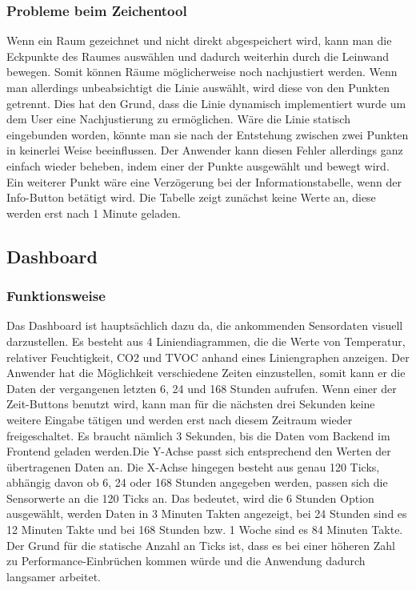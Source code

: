 \documentclass[]{article}
\begin{document}
				\subsubsection{Probleme beim Zeichentool}
		 		Wenn ein Raum gezeichnet und nicht direkt abgespeichert wird, kann man die Eckpunkte des Raumes auswählen und dadurch weiterhin durch die Leinwand bewegen. Somit können Räume möglicherweise noch nachjustiert werden. Wenn man allerdings unbeabsichtigt die Linie auswählt, wird diese von den Punkten getrennt. Dies hat den Grund, dass die Linie dynamisch implementiert wurde um dem User eine Nachjustierung zu ermöglichen. Wäre die Linie statisch eingebunden worden, könnte man sie nach der Entstehung zwischen zwei Punkten in keinerlei Weise beeinflussen. Der Anwender kann diesen Fehler allerdings ganz einfach wieder beheben, indem einer der Punkte ausgewählt und bewegt wird. \newline Ein weiterer Punkt wäre eine Verzögerung bei der Informationstabelle, wenn der Info-Button betätigt wird. Die Tabelle zeigt zunächst keine Werte an, diese werden erst nach 1 Minute geladen. 
				\newpage
			\subsection{Dashboard}
			\subsubsection{Funktionsweise}
			Das Dashboard ist hauptsächlich dazu da, die ankommenden Sensordaten visuell darzustellen. Es besteht aus 4 Liniendiagrammen, die die Werte von Temperatur, relativer Feuchtigkeit, CO2 und TVOC anhand eines Liniengraphen anzeigen. Der Anwender hat die Möglichkeit verschiedene Zeiten einzustellen, somit kann er die Daten der vergangenen letzten 6, 24 und 168 Stunden aufrufen.
			Wenn einer der Zeit-Buttons benutzt wird, kann man für die nächsten drei Sekunden keine weitere Eingabe tätigen und werden erst nach diesem Zeitraum wieder freigeschaltet. Es braucht nämlich 3 Sekunden, bis die Daten vom Backend im Frontend geladen werden.\newline Die Y-Achse passt sich entsprechend den Werten der übertragenen Daten an. Die X-Achse hingegen besteht aus genau 120 Ticks, abhängig davon ob 6, 24 oder 168 Stunden angegeben werden, passen sich die Sensorwerte an die 120 Ticks an. Das bedeutet, wird die 6 Stunden Option ausgewählt, werden Daten in 3 Minuten Takten angezeigt, bei 24 Stunden sind es 12 Minuten Takte und bei 168 Stunden bzw. 1 Woche sind es 84 Minuten Takte. Der Grund für die statische Anzahl an Ticks ist, dass es bei einer höheren Zahl zu Performance-Einbrüchen kommen würde und die Anwendung dadurch langsamer arbeitet.\newline
			
\end{document}
